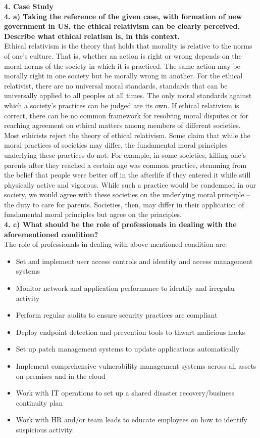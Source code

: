 \documentclass [12pt, a4paper]{article}
\begin{document}
\large
\textbf{4. Case Study}\\
\normalsize
\textbf{4. a) Taking the reference of the given case, with formation of new government in US, the ethical relativism can be clearly perceived. Describe what ethical relatism is, in this context.}\\
Ethical relativism is the theory that holds that morality is relative to the norms of one's culture. That is, whether an action is right or wrong depends on the moral norms of the society in which it is practiced. The same action may be morally right in one society but be morally wrong in another. For the ethical relativist, there are no universal moral standards, standards that can be universally applied to all peoples at all times. The only moral standards against which a society's practices can be judged are its own. If ethical relativism is correct, there can be no common framework for resolving moral disputes or for reaching agreement on ethical matters among members of different societies. Most ethicists reject the theory of ethical relativism. Some claim that while the moral practices of societies may differ, the fundamental moral principles underlying these practices do not. For example, in some societies, killing one's parents after they reached a certain age was common practice, stemming from the belief that people were better off in the afterlife if they entered it while still physically active and vigorous. While such a practice would be condemned in our society, we would agree with these societies on the underlying moral principle -- the duty to care for parents. Societies, then, may differ in their application of fundamental moral principles but agree on the principles.\\


\textbf{4. c) What should be the role of professionals in dealing with the aforementioned condition?}\\
The role of professionals in dealing with above mentioned condition are:
\begin{itemize}
	\item Set and implement user access controls and identity and access management systems
	\item Monitor network and application performance to identify and irregular activity
	\item Perform regular audits to ensure security practices are compliant
	\item Deploy endpoint detection and prevention tools to thwart malicious hacks
	\item Set up patch management systems to update applications automatically
	\item Implement comprehensive vulnerability management systems across all assets on-premises and in the cloud
	\item Work with IT operations to set up a shared disaster recovery/business continuity plan
	\item Work with HR and/or team leads to educate employees on how to identify suspicious activity.
\end{itemize}
\end{document}
